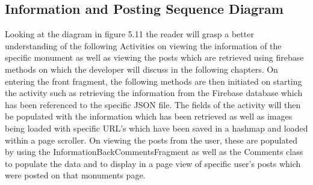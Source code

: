 \subsection{Information and Posting Sequence Diagram}
Looking at the diagram in figure 5.11 the reader will grasp a better understanding of the following Activities on viewing the information of the specific monument as well as viewing the posts which are retrieved using firebase methods on which the developer will discuss in the following chapters. On entering the front fragment, the following methods are then initiated on starting the activity such as retrieving the information from the Firebase database which has been referenced to the specific JSON file. The fields of the activity will then be populated with the information which has been retrieved as well as images being loaded with specific URL's which have been saved in a hashmap and loaded within a page scroller. On viewing the posts from the user, these are populated by using the InformationBackCommentsFragment as well as the Comments class to populate the data and to display in a page view of specific user's posts which were posted on that monuments page.\par

